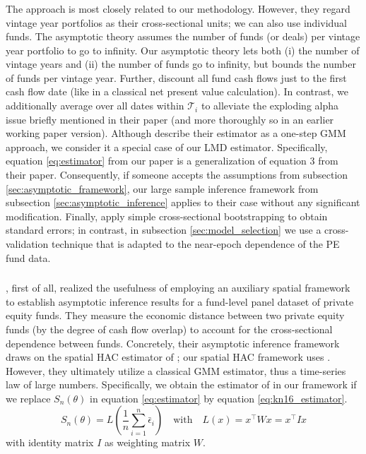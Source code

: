 \documentclass[12pt]{article}
\begin{document}
\subsubsection{\cite{DLP12}}

The \cite{DLP12} approach is most closely related to our methodology.
However, they regard vintage year portfolios as their cross-sectional units; we can also use individual funds.
The \cite{DLP12} asymptotic theory assumes the number of funds (or deals) per vintage year portfolio to go to infinity.
Our asymptotic theory lets both (i) the number of vintage years and (ii) the number of funds go to infinity, but bounds the number of funds per vintage year.
Further, \cite{DLP12} discount all fund cash flows just to the first cash flow date (like in a classical net present value calculation).
In contrast, we additionally average over all dates within $\mathcal{T}_{i}$ to alleviate the exploding alpha issue briefly mentioned in their paper (and more thoroughly so in an earlier working paper version).
Although \cite{DLP12} describe their estimator as a one-step GMM approach, we consider it a special case of our LMD estimator.
Specifically, equation \ref{eq:estimator} from our paper is a generalization of equation 3 from their paper.
Consequently, if someone accepts the assumptions from subsection \ref{sec:asymptotic_framework}, our large sample inference framework from subsection \ref{sec:asymptotic_inference} applies to their case without any significant modification.
Finally, \cite{DLP12} apply simple cross-sectional bootstrapping to obtain standard errors; in contrast, in subsection \ref{sec:model_selection} we use a cross-validation technique that is adapted to the near-epoch dependence of the PE fund data.

\subsubsection{\cite{KN16}}

\cite{KN16}, first of all, realized the usefulness of employing an auxiliary spatial framework to establish asymptotic inference results for a fund-level panel dataset of private equity funds.
They measure the economic distance between two private equity funds (by the degree of cash flow overlap) to account for the cross-sectional dependence between funds.
Concretely, their asymptotic inference framework draws on the spatial HAC estimator of \cite{C99}; our spatial HAC framework uses \cite{PP97,KS11,JP12}.
However, they ultimately utilize a classical GMM estimator, thus a time-series law of large numbers.
Specifically, we obtain the estimator of \cite[equation 18]{KN16} in our framework if we replace $S_n(\theta)$ in equation \ref{eq:estimator} by equation \ref{eq:kn16_estimator}.
\begin{equation}
\label{eq:kn16_estimator}
	S_n(\theta) = 
	L \left( 
	\frac{1}{n}
	\sum_{i=1}^n
	\bar{\epsilon}_{i} 
	\right)
	\quad
	\mathrm{with}
	\quad
	L(x) = x^{\top} W x = x^{\top} I x
\end{equation}
with identity matrix $I$ as weighting matrix $W$.
\end{document}
